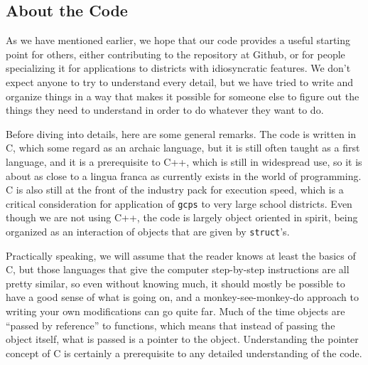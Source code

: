 \documentclass[12pt]{article}
\theoremstyle{definition}
\begin{document}

\begin{appendix}

\section{About the Code} \label{app:Code}

As we have mentioned earlier, we hope that our code provides a useful
starting point for others, either contributing to the repository at
Github, or for people specializing it for applications to districts
with idiosyncratic features.  We don't expect anyone to try to
understand every detail, but we have tried to write and organize
things in a way that makes it possible for someone else to figure out
the things they need to understand in order to do whatever they want
to do.

Before diving into details, here are some general remarks.  The code
is written in C, which some regard as an archaic language, but it is
still often taught as a first language, and it is a prerequisite to
C++, which is still in widespread use, so it is about as close to a
lingua franca as currently exists in the world of programming.  C is
also still at the front of the industry pack for execution speed,
which is a critical consideration for application of \texttt{gcps} to
very large school districts.  Even though we are not using C++, the
code is largely object oriented in spirit, being organized as an
interaction of objects that are given by \texttt{struct}'s.

Practically speaking, we will assume that the reader knows at least
the basics of C, but those languages that give the computer
step-by-step instructions are all pretty similar, so even without
knowing much, it should mostly be possible to have a good sense of
what is going on, and a monkey-see-monkey-do approach to writing your
own modifications can go quite far.  Much of the time objects are
``passed by reference'' to functions, which means that instead of
passing the object itself, what is passed is a pointer to the object.
Understanding the pointer concept of C is certainly a prerequisite to
any detailed understanding of the code.


\end{appendix}
\end{document}
